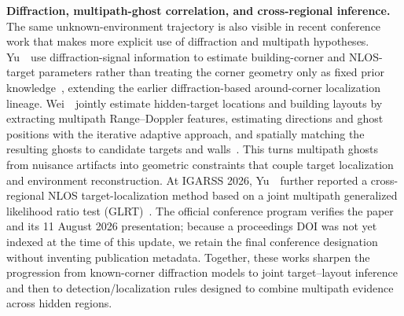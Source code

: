 \vspace{0.8mm}
\noindent \textbf{Diffraction, multipath-ghost correlation, and cross-regional inference.}
The same unknown-environment trajectory is also visible in recent conference work that makes more explicit use of diffraction and multipath hypotheses. Yu~\etal~use diffraction-signal information to estimate building-corner and NLOS-target parameters rather than treating the corner geometry only as fixed prior knowledge~\cite{yuDiffractionCornerNLOS2025}, extending the earlier diffraction-based around-corner localization lineage. Wei~\etal~jointly estimate hidden-target locations and building layouts by extracting multipath Range--Doppler features, estimating directions and ghost positions with the iterative adaptive approach, and spatially matching the resulting ghosts to candidate targets and walls~\cite{weiGhostCorrelationNLOS2025}. This turns multipath ghosts from nuisance artifacts into geometric constraints that couple target localization and environment reconstruction. At IGARSS 2026, Yu~\etal~further reported a cross-regional NLOS target-localization method based on a joint multipath generalized likelihood ratio test (GLRT)~\cite{yuCrossRegionalGLRTNLOS2026}. The official conference program verifies the paper and its 11 August 2026 presentation; because a proceedings DOI was not yet indexed at the time of this update, we retain the final conference designation without inventing publication metadata. Together, these works sharpen the progression from known-corner diffraction models to joint target--layout inference and then to detection/localization rules designed to combine multipath evidence across hidden regions.

